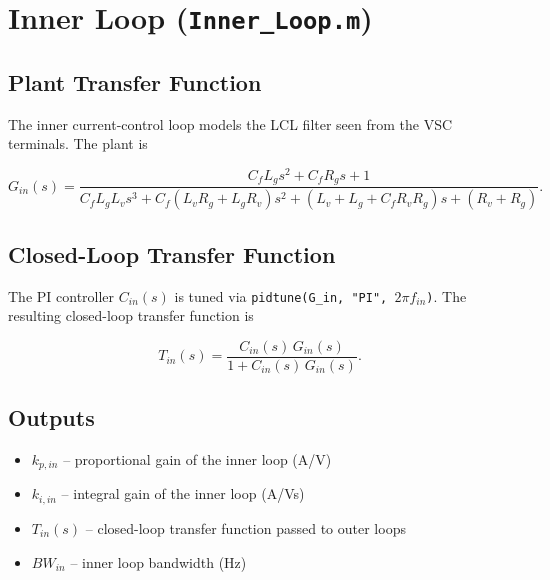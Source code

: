\documentclass[12pt, a4paper]{article}
\begin{document}
\section{Inner Loop (\texttt{Inner\_Loop.m})}

\subsection{Plant Transfer Function}

The inner current-control loop models the LCL filter seen from the VSC terminals.
The plant is

\begin{equation}
    G_{in}(s)
    = \frac{C_f L_g s^{2} + C_f R_g s + 1}
           {C_f L_g L_v s^{3}
            + C_f\!\left(L_v R_g + L_g R_v\right)s^{2}
            + \!\left(L_v + L_g + C_f R_v R_g\right)s
            + \left(R_v + R_g\right)}.
\end{equation}

\subsection{Closed-Loop Transfer Function}

The PI controller $C_{in}(s)$ is tuned via \texttt{pidtune(G\_in, "PI", $2\pi f_{in}$)}.
The resulting closed-loop transfer function is

\begin{equation}
    T_{in}(s) = \frac{C_{in}(s)\,G_{in}(s)}{1 + C_{in}(s)\,G_{in}(s)}.
\end{equation}

\subsection{Outputs}
\begin{itemize}
    \item $k_{p,in}$ -- proportional gain of the inner loop (A/V)
    \item $k_{i,in}$ -- integral gain of the inner loop (A/Vs)
    \item $T_{in}(s)$ -- closed-loop transfer function passed to outer loops
    \item $BW_{in}$ -- inner loop bandwidth (Hz)
\end{itemize}

\end{document}
